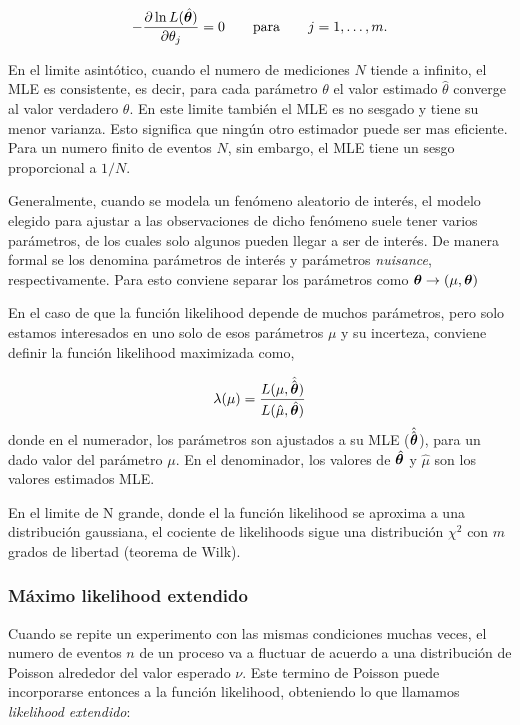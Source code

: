 \begin{equation}
  - \frac{\partial \ln L(\hat{\bm{\theta}})}{\partial \theta_j} = 0 \qquad \text{para} \qquad j = 1,\ldots,m.
\end{equation}

En el limite asintótico, cuando el numero de mediciones $N$ tiende a infinito, el MLE
es consistente, es decir, para cada parámetro $\theta$ el valor estimado $\hat{\theta}$
converge al valor verdadero $\theta$. En este limite también el MLE es no sesgado y tiene
su menor varianza. Esto significa que ningún otro estimador puede ser mas eficiente. Para
un numero finito de eventos $N$, sin embargo, el MLE tiene un sesgo proporcional a $1/N$.


Generalmente, cuando se modela un fenómeno aleatorio de interés, el modelo elegido
para ajustar a las observaciones de dicho fenómeno suele tener varios parámetros,
de los cuales solo algunos pueden llegar a ser de interés. De manera formal se los
denomina parámetros de interés y parámetros \emph{nuisance}, respectivamente.
Para esto conviene separar los parámetros como $\bm{\theta} \rightarrow (\mu, \bm{\theta})$

En el caso de que la función likelihood depende de muchos parámetros, pero solo estamos
interesados en uno solo de esos parámetros $\mu$ y su incerteza, conviene definir la
funci\'on likelihood maximizada como,

\begin{equation}
  \lambda(\mu) = \frac{L(\mu,\hat{\hat{\bm{\theta}}})}{L(\hat{\mu},\hat{\bm{\theta}})}
\end{equation}
%
donde en el numerador, los parámetros {\btheta} son ajustados a su MLE ($\hat{\hat{\bm{\theta}}}$),
para un dado valor del parámetro $\mu$. En el denominador, los valores de $\hat{\bm{\theta}}$
y $\hat{\mu}$ son los valores estimados MLE.

En el limite de N grande, donde el la función likelihood se aproxima a una distribución
gaussiana, el cociente de likelihoods sigue una distribución $\chi^2$ con $m$ grados de
libertad (teorema de Wilk).


\subsubsection{Máximo likelihood extendido}

Cuando se repite un experimento con las mismas condiciones muchas veces, el numero
de eventos $n$ de un proceso va a fluctuar de acuerdo a una distribución de Poisson
alrededor del valor esperado $\nu$. Este termino de Poisson puede incorporarse entonces
a la función likelihood, obteniendo lo que llamamos \emph{likelihood extendido}:

